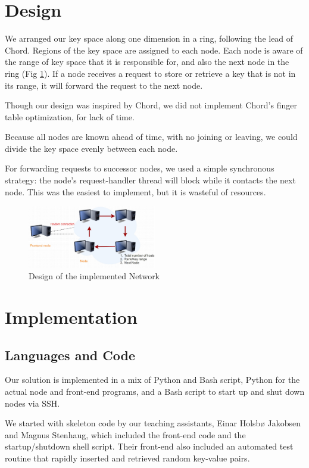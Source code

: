 \documentclass[11pt,conference]{IEEEtran}
\begin{document}
\section{Design}

We arranged our key space along one dimension in a ring, following the lead of
Chord\cite{chord}. Regions of the key space are assigned to each node. Each node
is aware of the range of key space that it is responsible for, and also the next
node in the ring (Fig \ref{fig:design}). If a node receives a request to store
or retrieve a key that is not in its range, it will forward the request to the
next node.

Though our design was inspired by Chord, we did not implement Chord's finger
table optimization, for lack of time.

Because all nodes are known ahead of time, with no joining or leaving, we could
divide the key space evenly between each node.

For forwarding requests to successor nodes, we used a simple synchronous
strategy: the node's request-handler thread will block while it contacts the
next node. This was the easiest to implement, but it is wasteful of resources.

\begin{figure}[h!]
  \centering
    \includegraphics[width=0.5\textwidth]{design}
    \caption{Design of the implemented Network}
    \label{fig:design}
\end{figure}


\section{Implementation}


\subsection{Languages and Code}

Our solution is implemented in a mix of Python and Bash script, Python for the
actual node and front-end programs, and a Bash script to start up and shut down
nodes via SSH.

We started with skeleton code by our teaching assistants, Einar Holsbø Jakobsen
and Magnus Stenhaug, which included the front-end code and the startup/shutdown
shell script. Their front-end also included an automated test routine that
rapidly inserted and retrieved random key-value pairs.
\end{document}
